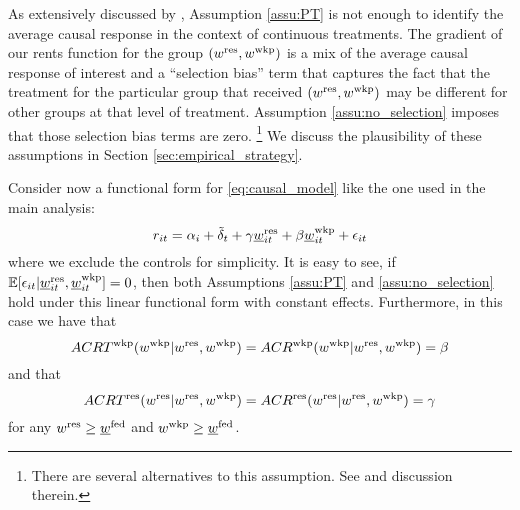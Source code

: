 As extensively discussed by \textcite{CallawayEtAl2021}, Assumption \ref{assu:PT} 
is not enough to identify the average causal response in the context of 
continuous treatments.
The gradient of our rents function for the group $(w^{\text{res}}, w^{\text{wkp}})$ is a mix
of the average causal response of interest and a ``selection bias'' term that
captures the fact that the treatment for the particular group that received
$(w^{\text{res}}, w^{\text{wkp}})$ may be different for other groups at that level of 
treatment.
Assumption \ref{assu:no_selection} imposes that those selection bias
terms are zero.%
\footnote{There are several alternatives to this assumption. 
See \textcite[][Section 3.3]{CallawayEtAl2021} and discussion therein.}
We discuss the plausibility of these assumptions in Section 
\ref{sec:empirical_strategy}.

Consider now a functional form for \eqref{eq:causal_model} like the one used in 
the main analysis:
$$
r_{it} = \alpha_i + \tilde\delta_t 
         + \gamma \underline{w}_{it}^{\text{res}} + \beta \underline{w}_{it}^{\text{wkp}}
         + \epsilon_{it}
$$
where we exclude the controls for simplicity.
It is easy to see, if 
$\operatorname{\mathbb{E}}[\epsilon_{it} | \underline{w}_{it}^{\text{res}}, \underline{w}_{it}^{\text{wkp}}] = 0$,
then both Assumptions \ref{assu:PT} and \ref{assu:no_selection} hold under 
this linear functional form with constant effects.
Furthermore, in this case we have that
\begin{equation*}
    ACRT^{\text{wkp}}(w^{\text{wkp}} | w^{\text{res}}, w^{\text{wkp}}) 
        = ACR^{\text{wkp}}(w^{\text{wkp}} | w^{\text{res}}, w^{\text{wkp}}) 
        = \beta
\end{equation*}
and that
\begin{equation*}
    ACRT^{\text{res}}(w^{\text{res}} | w^{\text{res}}, w^{\text{wkp}})
        = ACR^{\text{res}}(w^{\text{res}} | w^{\text{res}}, w^{\text{wkp}})
        = \gamma
\end{equation*}
for any $w^{\text{res}}\geq\underline{w}^{\text{fed}}$ and $w^{\text{wkp}}\geq\underline{w}^{\text{fed}}$.

